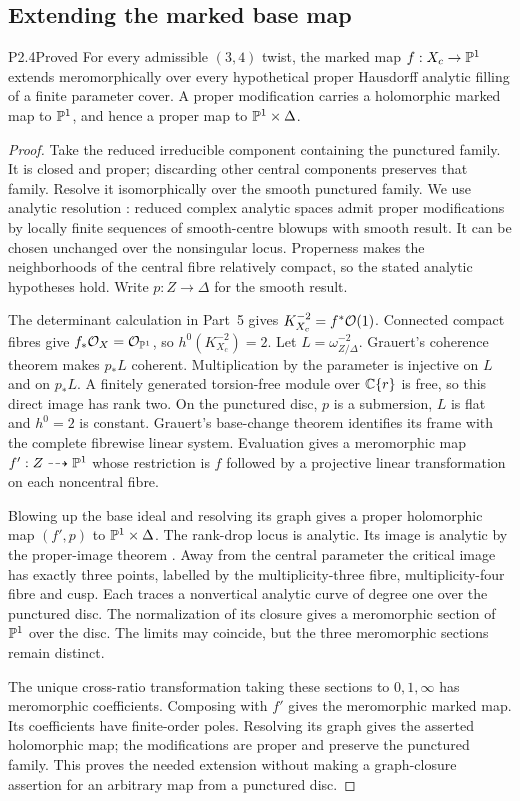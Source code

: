 \subsection{Extending the marked base map}
\begin{statement}{P2.4}{Proved}
For every admissible $(3,4)$ twist, the marked map $f:X_c\to\mathbb P^1$ extends meromorphically over every hypothetical proper Hausdorff analytic filling of a finite parameter cover. A proper modification carries a holomorphic marked map to $\mathbb P^1$, and hence a proper map to $\mathbb P^1\times\Delta$.
\end{statement}
\begin{proof}
Take the reduced irreducible component containing the punctured family. It is closed and proper; discarding other central components preserves that family. Resolve it isomorphically over the smooth punctured family. We use analytic resolution \cite[Theorems 1.6 and 13.3]{BM97}: reduced complex analytic spaces admit proper modifications by locally finite sequences of smooth-centre blowups with smooth result. It can be chosen unchanged over the nonsingular locus. Properness makes the neighborhoods of the central fibre relatively compact, so the stated analytic hypotheses hold. Write $p:Z\to\Delta$ for the smooth result.

The determinant calculation in Part~5 gives $K_{X_c}^{-2}=f^*\mathcal O(1)$. Connected compact fibres give $f_*\mathcal O_X=\mathcal O_{\mathbb P^1}$, so $h^0(K_{X_c}^{-2})=2$. Let $L=\omega_{Z/\Delta}^{-2}$. Grauert's coherence theorem \cite[Hauptsatz I]{Grauert60} makes $p_*L$ coherent. Multiplication by the parameter is injective on $L$ and on $p_*L$. A finitely generated torsion-free module over $\mathbb C\{r\}$ is free, so this direct image has rank two. On the punctured disc, $p$ is a submersion, $L$ is flat and $h^0=2$ is constant. Grauert's base-change theorem \cite[\S7, Satz 5]{Grauert60} identifies its frame with the complete fibrewise linear system. Evaluation gives a meromorphic map $f':Z\dashrightarrow\mathbb P^1$ whose restriction is $f$ followed by a projective linear transformation on each noncentral fibre.

Blowing up the base ideal and resolving its graph gives a proper holomorphic map $(f',p)$ to $\mathbb P^1\times\Delta$. The rank-drop locus is analytic. Its image is analytic by the proper-image theorem \cite[\S7, Satz 1]{Grauert60}. Away from the central parameter the critical image has exactly three points, labelled by the multiplicity-three fibre, multiplicity-four fibre and cusp. Each traces a nonvertical analytic curve of degree one over the punctured disc. The normalization of its closure gives a meromorphic section of $\mathbb P^1$ over the disc. The limits may coincide, but the three meromorphic sections remain distinct.

The unique cross-ratio transformation taking these sections to $0,1,\infty$ has meromorphic coefficients. Composing with $f'$ gives the meromorphic marked map. Its coefficients have finite-order poles. Resolving its graph gives the asserted holomorphic map; the modifications are proper and preserve the punctured family. This proves the needed extension without making a graph-closure assertion for an arbitrary map from a punctured disc.
\end{proof}

